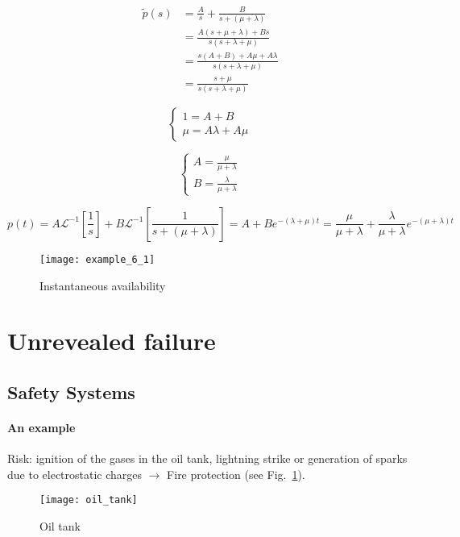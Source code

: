 \begin{equation*}
    \begin{split}
        \tilde{p}(s) &= \frac{A}{s} + \frac{B}{s+(\mu+\lambda)}\\
        &= \frac{A(s+\mu+\lambda) + Bs}{s(s+\lambda+\mu)} \\
        &= \frac{s(A+B) + A\mu + A\lambda}{s(s+\lambda+\mu)} \\
        &= \frac{s+\mu}{s(s+\lambda+\mu)}
    \end{split}
\end{equation*}

\begin{equation*}
    \begin{cases}
        1 = A+B \\
        \mu = A\lambda + A\mu
    \end{cases}
\end{equation*}

\begin{equation*}
    \begin{cases}
        A = \frac{\mu}{\mu+\lambda} \\
        B = \frac{\lambda}{\mu+\lambda}
    \end{cases}
\end{equation*}

\begin{equation*}
    p(t) = A\mathcal{L}^{-1}\left[\frac{1}{s}\right] + B\mathcal{L}^{-1}\left[\frac{1}{s+(\mu+\lambda)}\right] = A + Be^{-(\lambda+\mu)t} = \frac{\mu}{\mu+\lambda} + \frac{\lambda}{\mu+\lambda}e^{-(\mu+\lambda)t}
\end{equation*}

\begin{figure}[!htp]
    \centering
    \texttt{[image: example\_6\_1]}
    \caption{Instantaneous availability}
\end{figure}

\section{Unrevealed failure}
\subsection{Safety Systems}
\paragraph*{An example} Risk: ignition of the gases in the oil tank, lightning strike or generation of
sparks due to electrostatic charges $\to$ Fire protection (see Fig.~\ref{fig:oil_tank}).
\begin{figure}[!htp]
    \centering
    \texttt{[image: oil\_tank]}
    \caption{Oil tank}
    \label{fig:oil_tank}
\end{figure}

